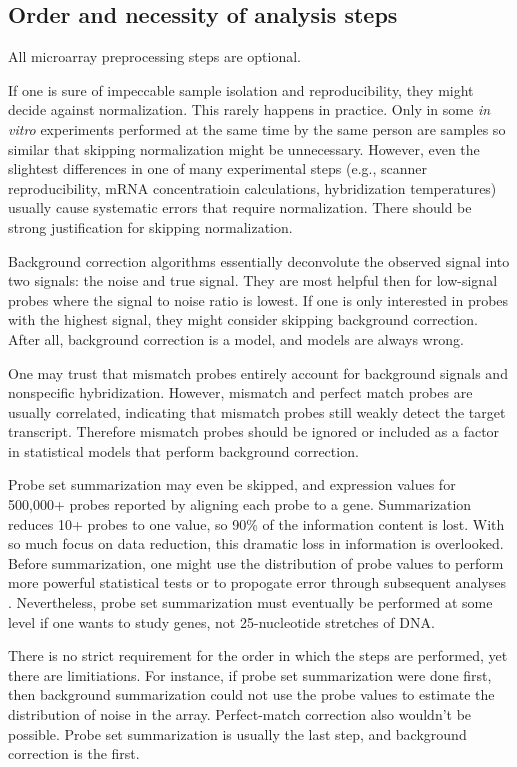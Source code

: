 \subsection{Order and necessity of analysis steps}

All microarray preprocessing steps are optional.
 
If one is sure of impeccable sample isolation and
reproducibility, they might decide against normalization. 
This rarely happens in practice. Only in some
\textit{in vitro} experiments performed at the same time by the same person
are samples so similar that skipping normalization might be unnecessary.
However, even the slightest differences in one of many experimental steps 
(e.g., scanner reproducibility, mRNA concentratioin calculations, hybridization
temperatures) usually cause systematic errors that require normalization.
There should be strong justification for skipping normalization.

Background correction algorithms essentially deconvolute the observed
signal into two signals: the noise and true signal.
They are most helpful then for low-signal probes where
the signal to noise ratio is lowest. If one is only interested in
probes with the highest signal, they might consider skipping
background correction. After all, background correction is a model, and models
are always wrong.

One may trust that mismatch probes entirely account for
background signals and nonspecific hybridization. 
However, mismatch and perfect match
probes are usually correlated, indicating that mismatch probes still
weakly detect the target transcript. Therefore mismatch probes should
be ignored or included as a factor in statistical models that perform
background correction.

Probe set summarization may even be skipped, and expression values
for 500,000+ probes reported by aligning each probe to a gene. Summarization
reduces 10+ probes to one value, so 90\% of the information content
is lost. With so much focus on data reduction, this
dramatic loss in information is overlooked. Before summarization, one might use
the distribution of probe values to perform more powerful statistical tests or to propogate
error through subsequent analyses \cite{Milo:2003tt,Liu:2005ey}.
Nevertheless, probe set summarization must eventually be performed
at some level if one wants to study genes, not 25-nucleotide stretches of DNA.

There is no strict requirement for the order in which the steps are performed,
yet there are limitiations. For instance, if probe set summarization were done first,
then background summarization could not use the probe values to estimate
the distribution of noise in the array. Perfect-match correction also wouldn't
be possible. Probe set summarization is usually the last step, and background
correction is the first.

